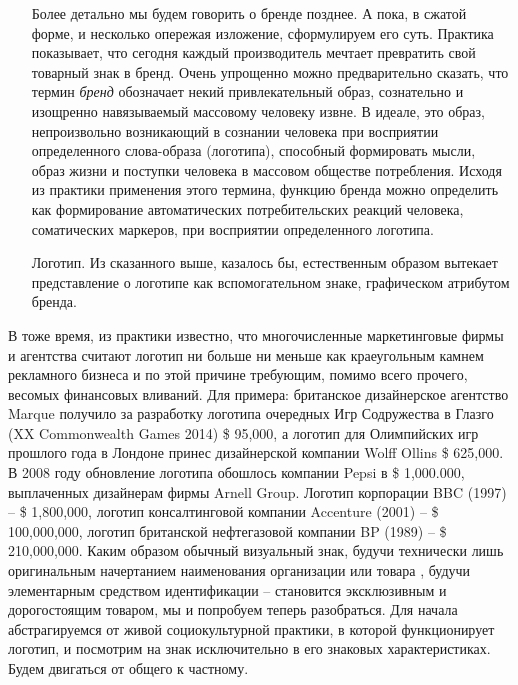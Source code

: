 \begin{itemize}
  Более детально мы будем говорить о бренде позднее. А пока, в сжатой форме,
  и несколько опережая изложение, сформулируем его суть. Практика показывает,
  что сегодня каждый производитель мечтает превратить свой товарный знак в бренд.
  Очень упрощенно можно предварительно сказать, что термин \emph{бренд} обозначает
  некий
  привлекательный образ, сознательно и изощренно навязываемый  массовому человеку
  извне. В идеале, это образ, непроизвольно возникающий в сознании человека при
  восприятии определенного слова-образа (логотипа), способный формировать мысли,
  образ жизни и поступки человека в массовом обществе потребления. Исходя из
  практики применения этого термина, функцию бренда можно определить как
  формирование автоматических потребительских реакций человека, соматических
  маркеров, при восприятии определенного логотипа.

\item[Логотип.] Из сказанного выше, казалось бы, естественным образом вытекает
  представление о логотипе как вспомогательном знаке, графическом атрибутом бренда.
\end{itemize}

В тоже время, из практики известно, что многочисленные маркетинговые фирмы и
агентства считают логотип  ни больше ни меньше как краеугольным камнем рекламного
бизнеса и по этой причине требующим, помимо всего прочего, весомых финансовых
вливаний. Для примера: британское дизайнерское агентство Marque получило за
разработку логотипа очередных Игр Содружества в Глазго
(XX Commonwealth Games 2014)  \$ 95,000, а логотип для Олимпийских игр прошлого
года в Лондоне принес дизайнерской компании Wolff Ollins  \$ 625,000.
В 2008 году обновление логотипа обошлось компании Pepsi в \$ 1,000.000,
выплаченных дизайнерам фирмы Arnell Group. Логотип корпорации BBC (1997) --
\$ 1,800,000,  логотип консалтинговой компании Accenture (2001) -- \$ 100,000,000,
логотип британской нефтегазовой компании BP (1989) – \$ 210,000,000.\autocite{logotipy}
Каким образом обычный визуальный знак, будучи технически лишь оригинальным
начертанием наименования организации или товара \autocite[][65]{rogers2001marketing},
будучи элементарным средством идентификации -- становится эксклюзивным и
дорогостоящим товаром, мы и попробуем теперь разобраться. Для начала
абстрагируемся от живой социокультурной практики, в которой функционирует
логотип, и посмотрим на знак исключительно в его знаковых характеристиках.
Будем двигаться от общего к частному.

